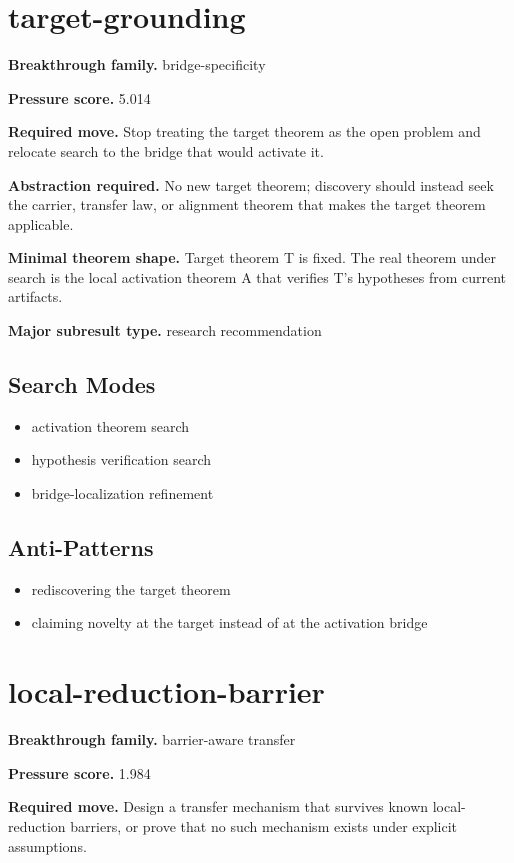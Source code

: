 \documentclass[11pt]{article}
\begin{document}
\section{target-grounding}
\textbf{Breakthrough family.} bridge-specificity

\textbf{Pressure score.} 5.014

\textbf{Required move.} Stop treating the target theorem as the open problem and relocate search to the bridge that would activate it.

\textbf{Abstraction required.} No new target theorem; discovery should instead seek the carrier, transfer law, or alignment theorem that makes the target theorem applicable.

\textbf{Minimal theorem shape.} Target theorem T is fixed. The real theorem under search is the local activation theorem A that verifies T's hypotheses from current artifacts.

\textbf{Major subresult type.} research recommendation

\subsection*{Search Modes}
\begin{itemize}[leftmargin=*,itemsep=0.2em]
\item activation theorem search
\item hypothesis verification search
\item bridge-localization refinement
\end{itemize}
\subsection*{Anti-Patterns}
\begin{itemize}[leftmargin=*,itemsep=0.2em]
\item rediscovering the target theorem
\item claiming novelty at the target instead of at the activation bridge
\end{itemize}
\section{local-reduction-barrier}
\textbf{Breakthrough family.} barrier-aware transfer

\textbf{Pressure score.} 1.984

\textbf{Required move.} Design a transfer mechanism that survives known local-reduction barriers, or prove that no such mechanism exists under explicit assumptions.
\end{document}
